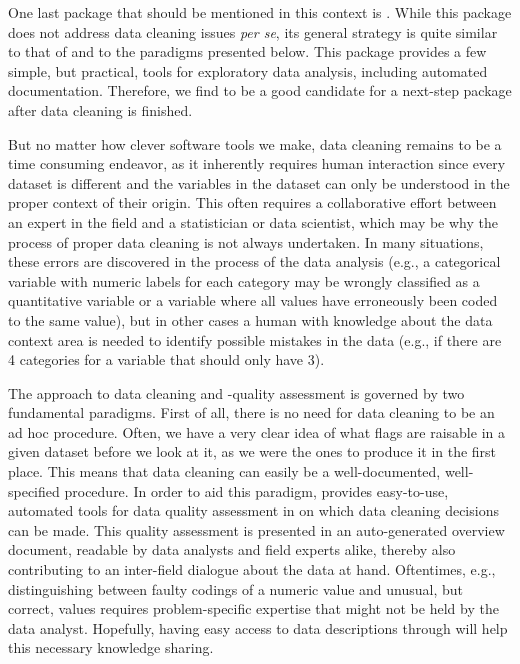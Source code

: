 \documentclass[article,shortnames]{jss}
\begin{document}
One last package that should be mentioned in this context is
 \citep{DataExplorer}. While this package does not
address data cleaning issues \emph{per se}, its general strategy is
quite similar to that of  and to the paradigms presented
below. This package provides a few simple, but practical, tools for
exploratory data analysis, including automated
documentation. Therefore, we find  to be a good
candidate for a next-step package after data cleaning is finished.

But no matter how clever software tools we make, data cleaning remains
to be a time consuming endeavor, as it inherently requires human
interaction since every dataset is different and the variables in the
dataset can only be understood in the proper context of their
origin. This often requires a collaborative effort between an expert
in the field and a statistician or data scientist, which may be why
the process of proper data cleaning is not always undertaken. In many
situations, these errors are discovered in the process of the data
analysis (e.g., a categorical variable with numeric labels for each
category may be wrongly classified as a quantitative variable or a
variable where all values have erroneously been coded to the same
value), but in other cases a human with knowledge about the data
context area is needed to identify possible mistakes in the data
(e.g., if there are 4 categories for a variable that should only have
3).

The  approach to data cleaning and -quality assessment is
governed by two fundamental paradigms. First of all, there is no need
for data cleaning to be an ad hoc procedure. Often, we have a very
clear idea of what flags are raisable in a given dataset before we
look at it, as we were the ones to produce it in the first place. This
means that data cleaning can easily be a well-documented,
well-specified procedure. In order to aid this paradigm, 
provides easy-to-use, automated tools for data quality assessment in
 \citep{R} on which data cleaning decisions can be made. This quality
assessment is presented in an auto-generated overview document,
readable by data analysts and field experts alike, thereby also
contributing to an inter-field dialogue about the data at
hand. Oftentimes, e.g., distinguishing between faulty codings of a
numeric value and unusual, but correct, values requires
problem-specific expertise that might not be held by the data
analyst. Hopefully, having easy access to data descriptions through
 will help this necessary knowledge sharing.
\end{document}
